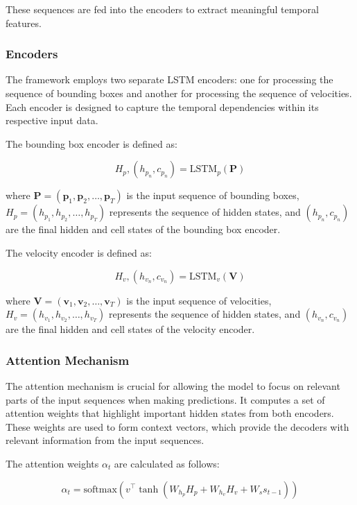 \documentclass[12pt,oneside]{book} %
\begin{document}
These sequences are fed into the encoders to extract meaningful temporal
features.

\subsubsection{Encoders}
The framework employs two separate LSTM encoders: one for processing the
sequence of bounding boxes and another for processing the sequence of
velocities. Each encoder is designed to capture the temporal dependencies
within its respective input data.

The bounding box encoder is defined as:

\begin{equation}
    H_p, (h_{p_n}, c_{p_n}) = \text{LSTM}_p(\mathbf{P})
\end{equation}

where $\mathbf{P} = (\mathbf{p}_1, \mathbf{p}_2, \ldots, \mathbf{p}_T)$ is the
input sequence of bounding boxes, $H_p = (h_{p_1}, h_{p_2}, \ldots, h_{p_T})$
represents the sequence of hidden states, and $(h_{p_n}, c_{p_n})$ are the
final hidden and cell states of the bounding box encoder.

The velocity encoder is defined as:

\begin{equation}
    H_v, (h_{v_n}, c_{v_n}) = \text{LSTM}_v(\mathbf{V})
\end{equation}

where $\mathbf{V} = (\mathbf{v}_1, \mathbf{v}_2, \ldots, \mathbf{v}_T)$ is the
input sequence of velocities, $H_v = (h_{v_1}, h_{v_2}, \ldots, h_{v_T})$
represents the sequence of hidden states, and $(h_{v_n}, c_{v_n})$ are the
final hidden and cell states of the velocity encoder.

\subsubsection{Attention Mechanism}

The attention mechanism is crucial for allowing the model to focus on relevant
parts of the input sequences when making predictions. It computes a set of
attention weights that highlight important hidden states from both encoders.
These weights are used to form context vectors, which provide the decoders with
relevant information from the input sequences.

The attention weights $\alpha_t$ are calculated as follows:

\begin{equation}
    \alpha_t = \text{softmax}(v^\top \tanh(W_{h_p} H_p + W_{h_v} H_v + W_s s_{t-1}))
\end{equation}
\end{document}
